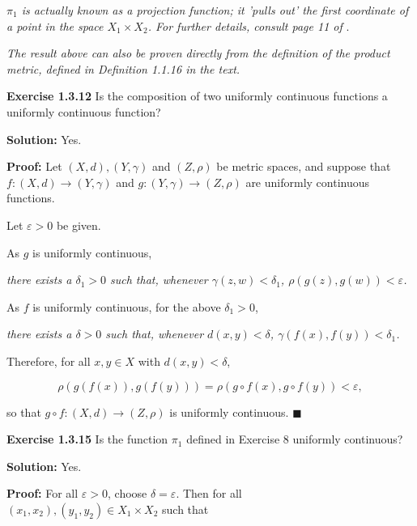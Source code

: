 \documentclass{article}
\begin{document}
\begin{tcolorbox}[opacitybacktitle=0.25, colback=yellow!20!white,colframe=blue!70!green,title={Remark 1:}]
\textit{$\pi_1$ is actually known as a projection function; it 'pulls out' the first coordinate of a point in the space $X_1\times X_2$. For further details, consult page 11 of} \cite{Spivak}.
\end{tcolorbox}


\begin{tcolorbox}[opacitybacktitle=0.25, colback=yellow!20!white,colframe=blue!70!green,title={Remark 2:}]
\textit{The result above can also be proven directly from the definition of the product metric, defined in Definition 1.1.16 in the text.}
\end{tcolorbox}
\begin{tcolorbox}
\textbf{Exercise 1.3.12} Is the composition of two uniformly continuous functions a uniformly continuous function?
\end{tcolorbox}
\textbf{Solution:} Yes.

\textbf{Proof:} Let $(X,d),(Y,\gamma )$ and $(Z,\rho)$ be metric spaces, and suppose that \\
$f:(X,d)\to(Y,\gamma )$ and $g:(Y,\gamma )\to (Z,\rho )$ are uniformly continuous functions.

Let $\varepsilon>0$ be given.

As $g$ is uniformly continuous,

\textit{there exists a $\delta_1>0$ such that, whenever $\gamma(z,w)<\delta_1$, $\rho(g(z),g(w))<\varepsilon$.}

As $f$ is uniformly continuous, for the above $\delta_1>0$,

\textit{there exists a $\delta >0$ such that, whenever $d(x,y)<\delta$, $\gamma (f(x),f(y))<\delta_1$.}


Therefore, for all $x,y\in X$ with $d(x,y)<\delta$,


\begin{equation*}
    \rho\left(g(f(x)),g(f(y))\right)=\rho\left(g\circ f(x),g\circ f(y)\right)<\varepsilon,
\end{equation*}

so that $g\circ f:(X,d)\to (Z,\rho )$ is uniformly continuous. $\blacksquare$
\begin{tcolorbox}
\textbf{Exercise 1.3.15} Is the function $\pi_1$ defined in Exercise 8 uniformly continuous?
\end{tcolorbox}
\textbf{Solution:} Yes.

\textbf{Proof:} For all $\varepsilon >0$, choose $\delta =\varepsilon$. Then for all \\
$(x_1,x_2),(y_1,y_2)\in X_1\times X_2$ such that 
\end{document}
